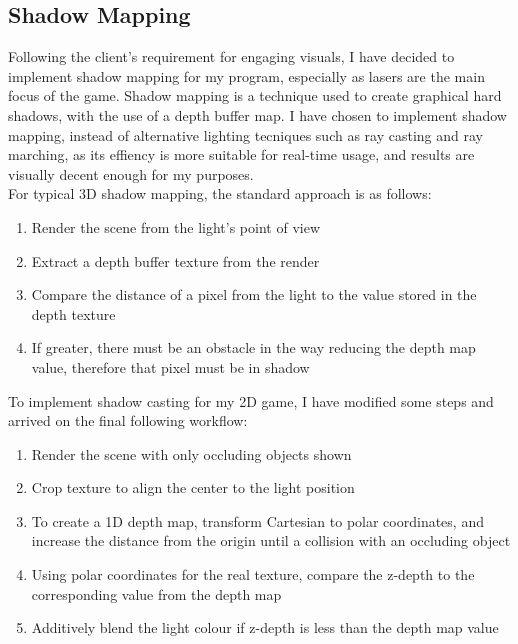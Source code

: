 \documentclass[../main/main.tex]{subfiles}
\begin{document}
\subsection{Shadow Mapping}
\label{sec:design-shadow}
Following the client's requirement for engaging visuals, I have decided to implement shadow mapping for my program, especially as lasers are the main focus of the game. Shadow mapping is a technique used to create graphical hard shadows, with the use of a depth buffer map. I have chosen to implement shadow mapping, instead of alternative lighting tecniques such as ray casting and ray marching, as its effiency is more suitable for real-time usage, and results are visually decent enough for my purposes.
\\
For typical 3D shadow mapping, the standard approach is as follows:

\begin{enumerate}
\item Render the scene from the light's point of view
\item Extract a depth buffer texture from the render
\item Compare the distance of a pixel from the light to the value stored in the depth texture
\item If greater, there must be an obstacle in the way reducing the depth map value, therefore that pixel must be in shadow
\end{enumerate}

\noindent To implement shadow casting for my 2D game, I have modified some steps and arrived on the final following workflow:

\begin{enumerate}
\item Render the scene with only occluding objects shown
\item Crop texture to align the center to the light position
\item To create a 1D depth map, transform Cartesian to polar coordinates, and increase the distance from the origin until a collision with an occluding object
\item Using polar coordinates for the real texture, compare the z-depth to the corresponding value from the depth map
\item Additively blend the light colour if z-depth is less than the depth map value
\end{enumerate}
\end{document}

